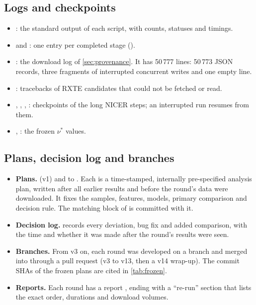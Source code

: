 \subsection{Logs and checkpoints}\label{sec:logs}
\begin{itemize}
\item {}: the standard output of each script, with counts, statuses and timings.
\item {} and : one entry per completed stage ().
\item {}: the download log of \cref{sec:provenance}. It has 50\,777 lines: 50\,773 JSON records,
three fragments of interrupted concurrent writes and one empty line.
\item {}: tracebacks of RXTE candidates that could not be fetched or read.
\item {}, ,
, : checkpoints of the long NICER steps; an
interrupted run resumes from them.
\item {}, : the frozen $\nu^\ast$ values.
\end{itemize}

\subsection{Plans, decision log and branches}\label{sec:plans}
\begin{itemize}
\item \textbf{Plans.}  (v1) and  to .
Each is a time-stamped, internally pre-specified analysis plan, written after all earlier results and before the round's data
were downloaded. It fixes the samples, features, models, primary comparison and decision rule. The matching block of
 is committed with it.
\item \textbf{Decision log.}  records every deviation, bug fix and added comparison, with the
time and whether it was made after the round's results were seen.
\item \textbf{Branches.} From v3 on, each round was developed on a branch  and merged into
 through a pull request (v3 to v13, then a v14 wrap-up). The commit SHAs of the frozen plans are cited in
\cref{tab:frozen}.
\item \textbf{Reports.} Each round has a report , ending with a ``re-run'' section that
lists the exact order, durations and download volumes.
\end{itemize}

